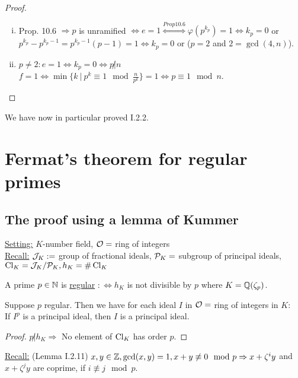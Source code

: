 \begin{proof}
\begin{enumerate}[i)]
\item Prop. 10.6 $\Rightarrow p$ is unramified $\iff e=1 \stackrel{Prop 10.6}{\iff} \varphi(p^{k_p})=1 \iff k_p=0$ or $p^{k_p}-p^{k_p -1} = p^{k_p -1} (p-1) = 1 \iff k_p=0$ or ($p=2$ and $2=\gcd(4,n)$).
\item $p \neq 2: e=1 \iff k_p=0 \iff p \not | n$\\
\hphantom{$p \neq 2:$} $f=1 \iff  \min\{k \ | \ p^k \equiv 1 \mod \frac{n}{p^k}\} =1 \iff p \equiv 1 \mod n$.
\end{enumerate}
\end{proof}

\begin{Bem}
We have now in particular proved I.2.2.
\end{Bem}

\chapter{Fermat's theorem for regular primes}
\section{The proof using a lemma of Kummer}
\underline{Setting:} $K$-number field, $\mathcal{O}=$ ring of integers\\
\underline{Recall:} $\mathcal{J}_K:= $ group of fractional ideals, $\mathcal{P}_K=$ subgroup of principal ideals,\linebreak
$\operatorname{Cl}_K=\mathcal{J}_K/\mathcal{P}_K, h_K=\#\operatorname{Cl}_K$

\begin{defi}
A prime $p \in \mathbb{N}$ is \underline{regular} $:\iff h_K$ is not divisible by $p$ where $K=\mathbb{Q}(\zeta_p)$.
\end{defi}

\begin{Bem}
Suppose $p$ regular. Then we have for each ideal $I$ in $\mathcal{O}=$ ring of integers in $K$:\\
If $I^p$ is a principal ideal, then $I$ is a principal ideal.
\end{Bem}

\begin{proof}
$p \not | h_K \Rightarrow$ No element of $\operatorname{Cl}_K$ has order $p$.
\end{proof}

\underline{Recall:} (Lemma I.2.11) $x,y \in \mathbb{Z}, \gcd(x,y)=1, x +y \not \equiv 0 \mod p\\
\Rightarrow x+\zeta^i y$ and $x+\zeta^j y$ are coprime, if $i \not \equiv j \mod p$.

